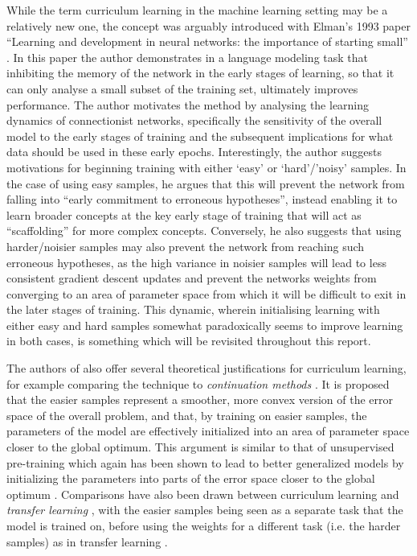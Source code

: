 While the term curriculum learning in the machine learning setting may be a relatively new one, the concept was arguably introduced with Elman's 1993 paper ``Learning and development in neural networks: the importance of starting small'' \cite{ELMAN199371}. In this paper the author demonstrates in a language modeling task that inhibiting the memory of the network in the early stages of learning, so that it can only analyse a small subset of the training set, ultimately improves performance. The author motivates the method by analysing the learning dynamics of connectionist networks, specifically the sensitivity of the overall model to the early stages of training and the subsequent implications for what data should be used in these early epochs. Interestingly, the author suggests motivations for beginning training with either `easy' or `hard'/'noisy' samples. In the case of using easy samples, he argues that this will prevent the network from falling into ``early commitment to erroneous hypotheses'', instead enabling it to learn broader concepts at the key early stage of training that will act as ``scaffolding'' for more complex concepts.  Conversely, he also suggests that using harder/noisier samples may also prevent the network from reaching such erroneous hypotheses, as the high variance in noisier samples will lead to less consistent gradient descent updates and prevent the networks weights from converging to an area of parameter space from which it will be difficult to exit in the later stages of training. This dynamic, wherein initialising learning with either easy and hard samples somewhat paradoxically seems to improve learning in both cases, is something which will be revisited throughout this report.

The authors of \cite{Bengio2009} also offer several theoretical justifications for curriculum learning, for example comparing the technique to \textit{continuation methods} \cite{Allgoer1980}. It is proposed that the easier samples represent a smoother, more convex version of the error space of the overall problem, and that, by training on easier samples, the parameters of the model are effectively initialized into an area of parameter space closer to the global optimum. This argument is similar to that of unsupervised pre-training \cite{erhan2009difficulty} which again has been shown to lead to better generalized models by initializing the parameters into parts of the error space closer to the global optimum \cite{bengio2012practical}. Comparisons have also been drawn between curriculum learning and \textit{transfer learning} \cite{pan2010survey}, with the easier samples being seen as a separate task that the model is trained on, before using the weights for a different task (i.e. the harder samples) as in transfer learning \cite{weinshall2018curriculum}.  

